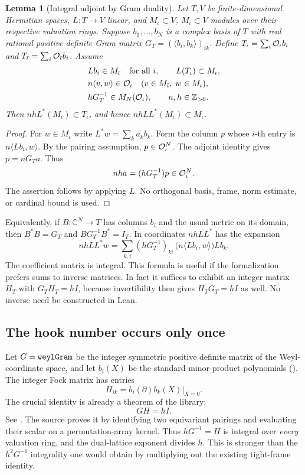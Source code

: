 \documentclass[11pt]{article}
\newtheorem{lemma}[theorem]{Lemma}
\theoremstyle{remark}\newtheorem{remark}[theorem]{Remark}
\newcommand{\C}{\mathbb C}\newcommand{\Z}{\mathbb Z}\newcommand{\Q}{\mathbb Q}
\newcommand{\code}[1]{\texttt{\detokenize{#1}}}
\newcommand{\base}{https://github.com/VladimirReshetnikov/ProveIt/blob/cdecfeba5d834fbf2f97de71cc7766b58ec4520e/Analysis/GeneralizedRiemannHypothesis/}
\newcommand{\src}[3]{\href{\base Lean/grh/src/#1.lean\#L#2}{\code{#3}}}
\begin{document}
\begin{lemma}[Integral adjoint by Gram duality]\label{lem:local}
Let $T,V$ be finite-dimensional Hermitian spaces, $L:T\to V$ linear, and $M_\iota\subset V$, $M_{\bar\iota}\subset V$ modules over their respective valuation rings. Suppose $b_1,\ldots,b_N$ is a complex basis of $T$ with real rational positive definite Gram matrix $G_T=(\langle b_i,b_k\rangle)_{ik}$. Define $T_\iota=\sum_i\mathcal O_\iota b_i$ and $T_{\bar\iota}=\sum_i\mathcal O_{\bar\iota} b_i$. Assume
\begin{align*}
 &L b_i\in M_{\bar\iota}\quad\text{for all }i,\qquad L(T_\iota)\subset M_\iota,\\
 &n\langle v,w\rangle\in\OO_\iota\quad(v\in M_{\bar\iota},\;w\in M_\iota),\\
 &hG_T^{-1}\in M_N(\OO_\iota),\qquad n,h\in\Z_{>0}.
\end{align*}
Then $nhL^*(M_\iota)\subset T_\iota$, and hence $nhLL^*(M_\iota)\subset M_\iota$.
\end{lemma}
\begin{proof}
For $w\in M_\iota$ write $L^*w=\sum_k a_k b_k$. Form the column $p$ whose $i$-th entry is $n\langle Lb_i,w\rangle$. By the pairing assumption, $p\in\mathcal O_\iota^N$. The adjoint identity gives $p=nG_Ta$. Thus
\[
 nh a=(hG_T^{-1})p\in\mathcal O_\iota^N.
\]
The assertion follows by applying $L$. No orthogonal basis, frame, norm estimate, or cardinal bound is used.
\end{proof}

Equivalently, if $B:\C^N\to T$ has columns $b_i$ and the usual metric on its domain, then $B^*B=G_T$ and $BG_T^{-1}B^*=I_T$. In coordinates $nhLL^*$ has the expansion
\[
 nhLL^*w=\sum_{k,i}(hG_T^{-1})_{ki}\,\bigl(n\langle Lb_i,w\rangle\bigr)Lb_k.
\]
The coefficient matrix is integral. This formula is useful if the formalization prefers sums to inverse matrices. In fact it suffices to exhibit an integer matrix $H_T$ with $G_TH_T=hI$, because invertibility then gives $H_TG_T=hI$ as well. No inverse need be constructed in Lean.

\subsection{The hook number occurs only once}

Let $G=\code{weylGram}$ be the integer symmetric positive definite matrix of the Weyl-coordinate space, and let $b_i(X)$ be the standard minor-product polynomials (\code{nablaBasis}). The integer Fock matrix has entries
\[
 H_{ik}=b_i(\partial)b_k(X)\big|_{X=0}.
\]
The crucial identity is already a theorem of the library:
\begin{equation}\label{eq:fock}
 GH=hI.
\end{equation}
See \src{Lib/GLn/SchurModule/GramMatrix}{101}{weylGram_mul_fockPairing}. The source proves it by identifying two equivariant pairings and evaluating their scalar on a permutation-array kernel. Thus $hG^{-1}=H$ is integral over \emph{every} valuation ring, and the dual-lattice exponent divides $h$. This is stronger than the $h^2G^{-1}$ integrality one would obtain by multiplying out the existing tight-frame identity.
\end{document}
